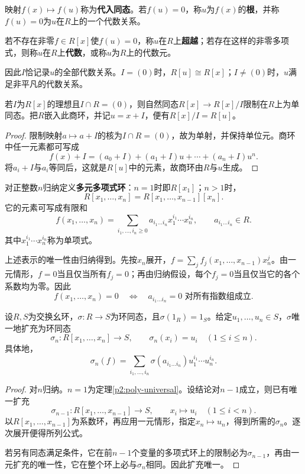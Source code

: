 \begin{definition}
映射$f(x)\mapsto f(u)$称为\textbf{代入同态}。若$f(u)=0$，称$u$为$f(x)$的\textbf{根}，并称$f(u)=0$为$u$在$R$上的一个代数关系。

若不存在非零$f\in R[x]$使$f(u)=0$，称$u$在$R$上\textbf{超越}；若存在这样的非零多项式，则称$u$在$R$上\textbf{代数}，或称$u$为$R$上的代数元。
\end{definition}

因此$I$恰记录$u$的全部代数关系。$I=(0)$时，$R[u]\cong R[x]$；$I\ne(0)$时，$u$满足非平凡的代数关系。

\begin{proposition}
若$I$为$R[x]$的理想且$I\cap R=(0)$，则自然同态$R[x]\to R[x]/I$限制在$R$上为单同态。把$R$嵌入此商环，并记$u=x+I$，便有$R[x]/I=R[u]$。
\end{proposition}
\begin{proof}
限制映射$a\mapsto a+I$的核为$I\cap R=(0)$，故为单射，并保持单位元。商环中任一元素都可写成
\[
f(x)+I=(a_0+I)+(a_1+I)u+\cdots+(a_n+I)u^n.
\]
将$a_i+I$与$a_i$等同后，这就是$R[u]$中的元素，故商环由$R$与$u$生成。
\end{proof}

\begin{definition}
对正整数$n$归纳定义\textbf{多元多项式环}：$n=1$时即$R[x_1]$；$n>1$时，
\[
R[x_1,\ldots,x_n]=R[x_1,\ldots,x_{n-1}][x_n].
\]
它的元素可写成有限和
\[
f(x_1,\ldots,x_n)
=\sum_{i_1,\ldots,i_n\ge0}a_{i_1\ldots i_n}x_1^{i_1}\cdots x_n^{i_n},
\qquad a_{i_1\ldots i_n}\in R.
\]
其中$x_1^{i_1}\cdots x_n^{i_n}$称为单项式。
\end{definition}

上述表示的唯一性由归纳得到。先按$x_n$展开，$f=\sum_j f_j(x_1,\ldots,x_{n-1})x_n^j$。由一元情形，$f=0$当且仅当所有$f_j=0$；再由归纳假设，每个$f_j=0$当且仅当它的各个系数均为零。因此
\[
f(x_1,\ldots,x_n)=0
\quad\Longleftrightarrow\quad
a_{i_1\ldots i_n}=0\text{ 对所有指数组成立}.
\]

\begin{theorem}\label{p2:multi-poly-universal}
设$R,S$为交换幺环，$\sigma:R\to S$为环同态，且$\sigma(1_R)=1_S$。给定$u_1,\ldots,u_n\in S$，$\sigma$唯一地扩充为环同态
\[
\sigma_n:R[x_1,\ldots,x_n]\to S,
\qquad \sigma_n(x_i)=u_i\quad(1\le i\le n).
\]
具体地，
\[
\sigma_n(f)=\sum_{i_1,\ldots,i_n}
\sigma(a_{i_1\ldots i_n})u_1^{i_1}\cdots u_n^{i_n}.
\]
\end{theorem}
\begin{proof}
对$n$归纳。$n=1$为定理\ref{p2:poly-universal}。设结论对$n-1$成立，则已有唯一扩充
\[
\sigma_{n-1}:R[x_1,\ldots,x_{n-1}]\to S,
\qquad x_i\mapsto u_i\quad(1\le i<n).
\]
以$R[x_1,\ldots,x_{n-1}]$为系数环，再应用一元情形，指定$x_n\mapsto u_n$，得到所需的$\sigma_n$。逐次展开便得所列公式。

若另有同态满足条件，它在前$n-1$个变量的多项式环上的限制必为$\sigma_{n-1}$，再由一元扩充的唯一性，它在整个环上必与$\sigma_n$相同。因此扩充唯一。
\end{proof}


